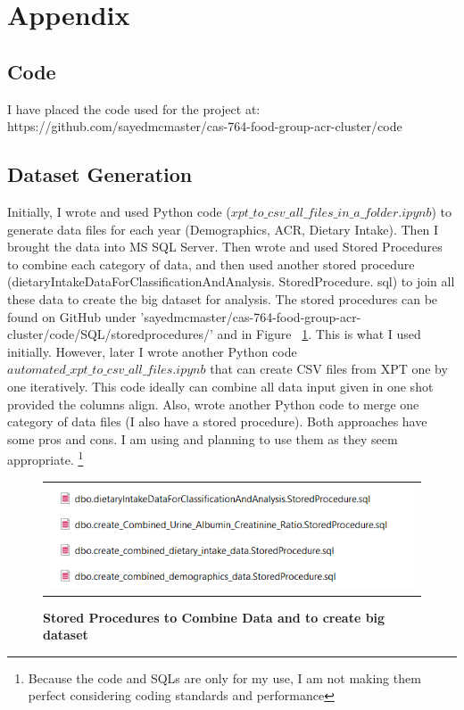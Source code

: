 \pagebreak
\section{Appendix}

\subsection{Code}
\flushleft \justifying I have placed the code used for the project at: https://github.com/sayedmcmaster/cas-764-food-group-acr-cluster/code %

\subsection{Dataset Generation}
\flushleft \justifying Initially, I wrote and used Python code ($xpt\_to\_csv\_all\_files\_in\_a\_folder.ipynb$) to generate data files for each year (Demographics, ACR, Dietary Intake). Then I brought the data into MS SQL Server. Then wrote and used Stored Procedures to combine each category of data, and then used another stored procedure (dietaryIntakeDataForClassificationAndAnalysis. StoredProcedure. sql) to join all these data to create the big dataset for analysis. The stored procedures can be found on GitHub under 'sayedmcmaster/cas-764-food-group-acr-cluster/code/SQL/storedprocedures/' and in Figure ~\ref{sp-combine}. This is what I used initially. However, later I wrote another Python code $automated\_xpt\_to\_csv\_all\_files.ipynb$ that can create CSV files from XPT one by one iteratively. This code ideally can combine all data input given in one shot provided the columns align. Also, wrote another Python code to merge one category of data files (I also have a stored procedure). Both approaches have some pros and cons. I am using and planning to use them as they seem appropriate. \footnote{Because the code and SQLs are only for my use, I am not making them perfect considering coding standards and performance}

\begin{figure}[!htb]
\begin{tabular}{c}
\includegraphics[scale=1]{images/datasetgenerationcode/create-data-set.png} \\
\end{tabular}
\caption{\textbf{Stored Procedures to Combine Data and to create big dataset}}
\label{sp-combine}
\vspace{0.25cm}
\end{figure}

